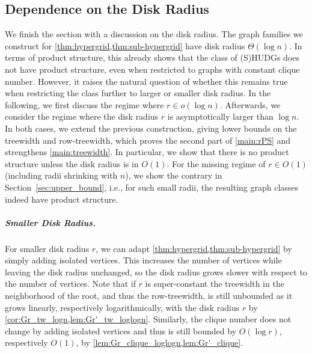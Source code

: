 \subsection{Dependence on the Disk Radius}
\label{sec:disk-radius}
%
%
We finish the section with a discussion on the disk radius.
The graph families we construct for \cref{thm:hypergrid,thm:sub-hypergrid} have disk radius $ \Theta(\log n) $.
In terms of product structure, this already shows that the class of (S)HUDGs does not have product structure, even when restricted to graphs with constant clique number.
However, it raises the natural question of whether this remains true when restricting the class further to larger or smaller disk radius.
In the following, we first discuss the regime where $r \in o(\log n)$.
Afterwards, we consider the regime where the disk radius $r$ is asymptotically larger than $\log n$.
In both cases, we extend the previous construction, giving lower bounds on the treewidth and row-treewidth, which proves the second part of \cref{main:rPS} and strengthens \cref{main:treewidth}.
In particular, we show that there is no product structure unless the disk radius is in $ O(1) $.
For the missing regime of $r \in O(1)$ (including radii shrinking with $n$), we show the contrary in Section~\ref{sec:upper_bound}, i.e., for such small radii, the resulting graph classes indeed have product structure.
%
%
% 
%
%
\subparagraph{Smaller Disk Radius.}
%
For smaller disk radius $r$, we can adapt \cref{thm:hypergrid,thm:sub-hypergrid} by simply adding isolated vertices.
This increases the number of vertices while leaving the disk radius unchanged, so the disk radius grows slower with respect to the number of vertices.
Note that if $ r $ is super-constant the treewidth in the neighborhood of the root, and thus the row-treewidth, is still unbounded as it grows linearly, respectively logarithmically, with the disk radius $ r $ by \cref{cor:Gr_tw_logn,lem:Gr'_tw_loglogn}.
Similarly, the clique number does not change by adding isolated vertices and thus is still bounded by $ O(\log r) $, respectively $ O(1) $, by \cref{lem:Gr_clique_loglogn,lem:Gr'_clique}.
